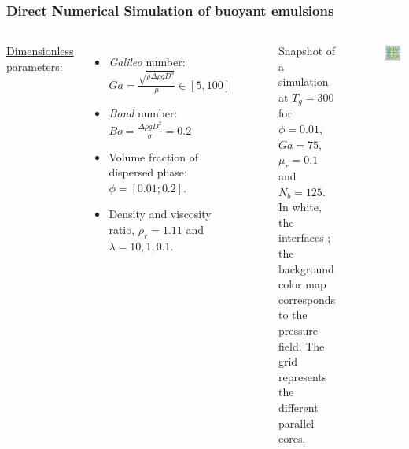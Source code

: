 \documentclass{sintefbeamer}
\begin{document}
\begin{frame}
  \frametitle{Direct Numerical Simulation of buoyant emulsions}
  \begin{columns}
  \underline{Dimensionless parameters:} 
  \begin{itemize}
    \item \textit{Galileo} number: $Ga =\frac{\sqrt{\rho \Delta\rho gD^3}}{\mu} \in [5, 100]$
    \item \textit{Bond} number: $Bo = \frac{\Delta \rho g D^2}{\sigma} = 0.2$ 
    \item Volume fraction of dispersed phase: $\phi = [0.01;0.2]$. 
    \item Density and viscosity ratio, $\rho_r=1.11$ and $\lambda= 10,1,0.1$. 
  \end{itemize}
  
\begin{figure}
  \caption{Snapshot of a simulation at $T_g = 300$ for $\phi = 0.01$, $Ga = 75$, $\mu_r = 0.1$ and $N_b = 125$. In white, the interfaces ; the background color map corresponds to the pressure field. The grid represents the different parallel cores.
  }
\end{figure}
\centering
\includegraphics[width =  1.1\textwidth]{image/PHI_01_Ga_75.png}
  \end{columns}
\end{frame}
\end{document}

